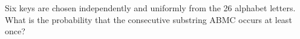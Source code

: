 Six keys are chosen independently and uniformly from the 26 alphabet letters. What is the probability that the consecutive substring ABMC occurs at least once?
